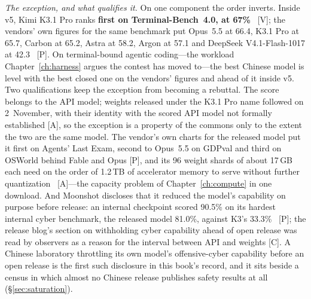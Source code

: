 \emph{The exception, and what qualifies it.} On one component the order inverts. Inside v5, Kimi K3.1 Pro ranks \textbf{first on Terminal-Bench~4.0, at 67\%}~\cite{mdl-aa-v5} [V]; the vendors' own figures for the same benchmark put Opus~5.5 at 66.4, K3.1 Pro at 65.7, Carbon at 65.2, Astra at 58.2, Argon at 57.1 and DeepSeek V4.1-Flash-1017 at 42.3~\cite{mdl-kimi-k31,mdl-gemini4,mdl-v41flash-1017} [P]. On terminal-bound agentic coding---the workload Chapter~\ref{ch:harness} argues the contest has moved to---the best Chinese model is level with the best closed one on the vendors' figures and ahead of it inside v5. Two qualifications keep the exception from becoming a rebuttal. The score belongs to the API model; weights released under the K3.1 Pro name followed on 2~November, with their identity with the scored API model not formally established [A], so the exception is a property of the commons only to the extent the two are the same model. The vendor's own charts for the released model put it first on Agents' Last Exam, second to Opus~5.5 on GDPval and third on OSWorld behind Fable and Opus [P], and its 96 weight shards of about 17\,GB each need on the order of 1.2\,TB of accelerator memory to serve without further quantization~\cite{lit-berman-nov,lit-k31-weights} [A]---the capacity problem of Chapter~\ref{ch:compute} in one download. And Moonshot discloses that it reduced the model's capability on purpose before release: an internal checkpoint scored 90.5\% on its hardest internal cyber benchmark, the released model 81.0\%, against K3's 33.3\%~\cite{mdl-kimi-k31} [P]; the release blog's section on withholding cyber capability ahead of open release was read by observers as a reason for the interval between API and weights [C]. A Chinese laboratory throttling its own model's offensive-cyber capability before an open release is the first such disclosure in this book's record, and it sits beside a census in which almost no Chinese release publishes safety results at all (\S\ref{sec:saturation}).

